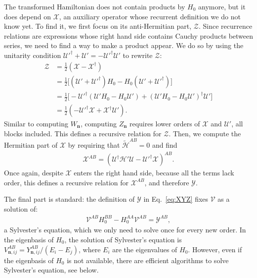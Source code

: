 
The transformed Hamiltonian does not contain products by $H_0$ anymore, but it
does depend on $\mathcal{X}$, an auxiliary operator whose recurrent definition
we do not know yet.
To find it, we first focus on its anti-Hermitian part, $\mathcal{Z}$.
Since recurrence relations are expressions whose right hand side contains
Cauchy products between series, we need to find a way to make a product appear.
We do so by using the unitarity condition $\mathcal{U}'^\dagger + \mathcal{U}' =
-\mathcal{U}'^\dagger \mathcal{U}'$ to rewrite $\mathcal{Z}$:
%
\begin{align}
\label{eq:Z}
\mathcal{Z}
&= \frac{1}{2} (\mathcal{X} - \mathcal{X}^{\dagger}) \nonumber \\
&= \frac{1}{2}\Big[ (\mathcal{U}' + \mathcal{U}'^{\dagger}) H_0 - H_0 (\mathcal{U}' + \mathcal{U}'^{\dagger}) \Big] \nonumber \\
&= \frac{1}{2} \Big[ - \mathcal{U}'^{\dagger} (\mathcal{U}'H_0 - H_0 \mathcal{U}') + (\mathcal{U}'H_0 - H_0 \mathcal{U}')^{\dagger} \mathcal{U}' \Big] \nonumber \\
&= \frac{1}{2} (-\mathcal{U}'^{\dagger} \mathcal{X} + \mathcal{X}^{\dagger} \mathcal{U}').
\end{align}
%
Similar to computing $W_{\mathbf{n}}$, computing $Z_{\mathbf{n}}$ requires lower orders of
$\mathcal{X}$ and $\mathcal{U}'$, all blocks included.
This defines a recursive relation for $\mathcal{Z}$.
Then, we compute the Hermitian part of $\mathcal{X}$ by requiring that
$\tilde{\mathcal{H}}^{AB} = 0$ and find
%
\begin{align}
\label{eq:Y}
\mathcal{X}^{AB} = (\mathcal{U}^\dagger \mathcal{H}' \mathcal{U} -
\mathcal{U}'^\dagger \mathcal{X})^{AB}.
\end{align}
%
Once again, despite $\mathcal{X}$ enters the right hand side, because all the
terms lack  order, this defines a recursive relation for $\mathcal{X}^{AB}$,
and therefore $\mathcal{Y}$.

The final part is standard: the definition of $\mathcal{Y}$ in
Eq.~\eqref{eq:XYZ} fixes $\mathcal{V}$ as a solution of:
%
\begin{align}
\label{eq:sylvester}
\mathcal{V}^{AB}H_0^{BB} - H_0^{AA} \mathcal{V}^{AB} = \mathcal{Y}^{AB},
\end{align}
%
a Sylvester's equation, which we only need to solve once for every new order.
In the eigenbasis of $H_0$, the solution of Sylvester's equation is
$V^{AB}_{\mathbf{n}, ij} = Y^{AB}_{\mathbf{n}, ij}/(E_i - E_j)$, where $E_i$ are the eigenvalues of
$H_0$.
However, even if the eigenbasis of $H_0$ is not available, there are efficient
algorithms to solve Sylvester's equation, see below.

